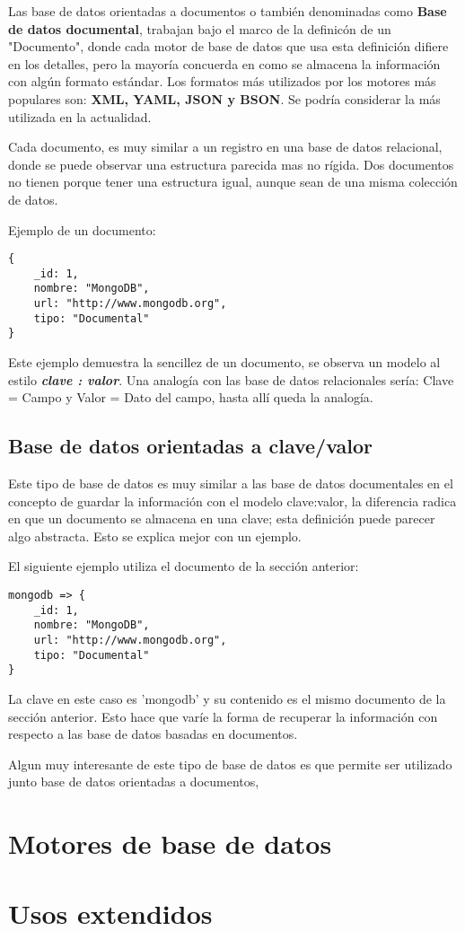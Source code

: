 Las base de datos orientadas a documentos o tambi\'en denominadas como {\bf Base de datos documental}, trabajan bajo el marco de la definic\'on de un "Documento", donde cada motor de base de datos que usa esta definici\'on difiere en los detalles, pero la mayor\'ia concuerda en como se almacena la informaci\'on con alg\'un formato est\'andar. Los formatos m\'as utilizados por los motores m\'as populares son: {\bf XML, YAML, JSON y BSON}. Se podr\'ia considerar la m\'as utilizada en la actualidad.

Cada documento, es muy similar a un registro en una base de datos relacional, donde se puede observar una estructura parecida mas no r\'igida. Dos documentos no tienen porque tener una estructura igual, aunque sean de una misma colecci\'on de datos.

Ejemplo de un documento:

\begin{lstlisting}
{
	_id: 1,
	nombre: "MongoDB",
	url: "http://www.mongodb.org",
	tipo: "Documental"
}
\end{lstlisting}

Este ejemplo demuestra la sencillez de un documento, se observa un modelo al estilo \textit{\textbf{clave : valor}}. Una analog\'ia con las base de datos relacionales ser\'ia: Clave = Campo y Valor = Dato del campo, hasta all\'i queda la analog\'ia.

\subsection{Base de datos orientadas a clave/valor}

Este tipo de base de datos es muy similar a las base de datos documentales en el concepto de guardar la informaci\'on con el modelo clave:valor, la diferencia radica en que un documento se almacena en una clave; esta definici\'on puede parecer algo abstracta. Esto se explica mejor con un ejemplo.

El siguiente ejemplo utiliza el documento de la secci\'on anterior:

\begin{lstlisting}
mongodb => {
	_id: 1,
	nombre: "MongoDB",
	url: "http://www.mongodb.org",
	tipo: "Documental"
}
\end{lstlisting}

La clave en este caso es 'mongodb' y su contenido es el mismo documento de la secci\'on anterior. Esto hace que var\'ie la forma de recuperar la informaci\'on con respecto a las base de datos basadas en documentos.

Algun muy interesante de este tipo de base de datos es que permite ser utilizado junto base de datos orientadas a documentos,  

\section{Motores de base de datos}

\section{Usos extendidos}
